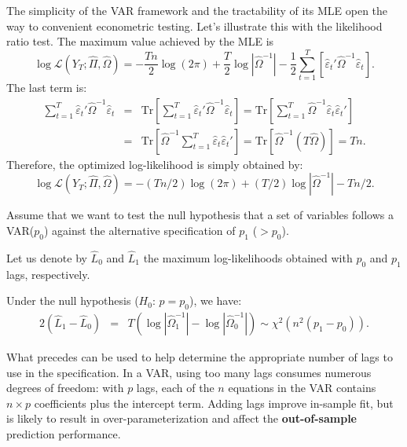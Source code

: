 \documentclass[
]{book}
\theoremstyle{definition}
\theoremstyle{definition}
\theoremstyle{definition}
\theoremstyle{definition}
\theoremstyle{remark}
\begin{document}
The simplicity of the VAR framework and the tractability of its MLE open the way to convenient econometric testing. Let's illustrate this with the likelihood ratio test. The maximum value achieved by the MLE is
\[
\log\mathcal{L}(Y_{T};\hat{\Pi},\hat{\Omega}) = -\frac{Tn}{2}\log(2\pi)+\frac{T}{2}\log\left|\hat{\Omega}^{-1}\right| -\frac{1}{2}\sum_{t=1}^{T}\left[\hat{\varepsilon}_{t}'\hat{\Omega}^{-1}\hat{\varepsilon}_{t}\right].
\]
The last term is:
\begin{eqnarray*}
\sum_{t=1}^{T}\hat{\varepsilon}_{t}'\hat{\Omega}^{-1}\hat{\varepsilon}_{t} &=& \mbox{Tr}\left[\sum_{t=1}^{T}\hat{\varepsilon}_{t}'\hat{\Omega}^{-1}\hat{\varepsilon}_{t}\right] = \mbox{Tr}\left[\sum_{t=1}^{T}\hat{\Omega}^{-1}\hat{\varepsilon}_{t}\hat{\varepsilon}_{t}'\right]\\
&=&\mbox{Tr}\left[\hat{\Omega}^{-1}\sum_{t=1}^{T}\hat{\varepsilon}_{t}\hat{\varepsilon}_{t}'\right] = \mbox{Tr}\left[\hat{\Omega}^{-1}\left(T\hat{\Omega}\right)\right]=Tn.
\end{eqnarray*}
Therefore, the optimized log-likelihood is simply obtained by:
\begin{equation}
\log\mathcal{L}(Y_{T};\hat{\Pi},\hat{\Omega})=-(Tn/2)\log(2\pi)+(T/2)\log\left|\hat{\Omega}^{-1}\right|-Tn/2.\label{eq:optimzedLogL}
\end{equation}

Assume that we want to test the null hypothesis that a set of variables follows a VAR(\(p_{0}\)) against the alternative
specification of \(p_{1}\) (\(>p_{0}\)).

Let us denote by \(\hat{L}_{0}\) and \(\hat{L}_{1}\) the maximum log-likelihoods obtained with \(p_{0}\) and \(p_{1}\) lags, respectively.

Under the null hypothesis (\(H_0\): \(p=p_0\)), we have:
\begin{eqnarray*}
2\left(\hat{L}_{1}-\hat{L}_{0}\right)&=&T\left(\log\left|\hat{\Omega}_{1}^{-1}\right|-\log\left|\hat{\Omega}_{0}^{-1}\right|\right)  \sim \chi^2(n^{2}(p_{1}-p_{0})).
\end{eqnarray*}

What precedes can be used to help determine the appropriate number of lags to use in the specification. In a VAR, using too many lags consumes numerous degrees of freedom: with \(p\) lags, each of the \(n\) equations in the VAR contains \(n\times p\) coefficients plus the intercept term. Adding lags improve in-sample fit, but is likely to result in over-parameterization and affect the \textbf{out-of-sample} prediction performance.
\end{document}
